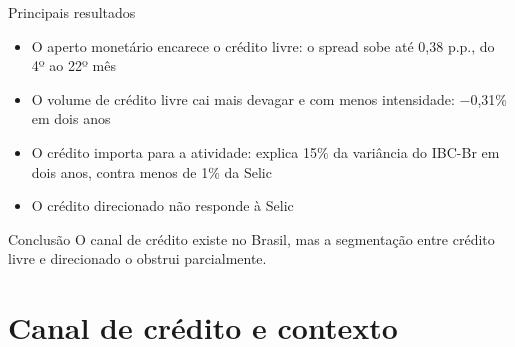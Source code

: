 \documentclass[11pt,aspectratio=169]{beamer}
\begin{document}
\begin{frame}{Principais resultados}
  \begin{itemize}
    \item O aperto monetário \alert{encarece o crédito livre}: o spread sobe até 0,38 p.p., do 4º ao 22º mês
    \item O \alert{volume} de crédito livre cai mais devagar e com menos intensidade: $-$0,31\% em dois anos
    \item O crédito \alert{importa para a atividade}: explica 15\% da variância do IBC-Br em dois anos, contra menos de 1\% da Selic
    \item O crédito direcionado \alert{não responde} à Selic
  \end{itemize}
  \vspace{6pt}
  \begin{block}{Conclusão}
    O canal de crédito existe no Brasil, mas a segmentação entre crédito livre e direcionado o obstrui parcialmente.
  \end{block}
\end{frame}

\section{Canal de crédito e contexto}
\end{document}
